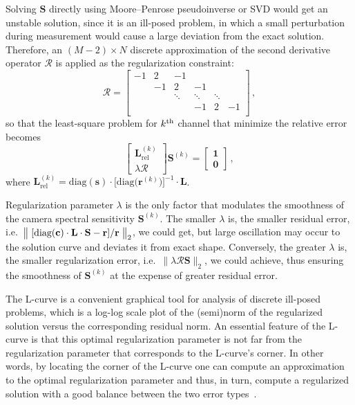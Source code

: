 \documentclass[9pt,twocolumn,twoside]{osajnl}
\begin{document}
Solving $\mathbf{S}$ directly using Moore–Penrose pseudoinverse or SVD would get an unstable solution, since it is an ill-posed problem, in which a small perturbation during measurement would cause a large deviation from the exact solution\cite{Forsgren:02}. Therefore, an $(M-2)\times{}N$ discrete approximation of the second derivative operator $\mathcal{R}$ is applied as the regularization constraint:
\begin{equation}
\mathcal{R} = \begin{bmatrix}
-1	& 2  & -1 	 &  	  &  	   &  	\\
& -1 & 2 	 & -1 	  &  	   &  	\\
&	 & \ddots& \ddots & \ddots &  	\\
&	 & 	 	 & -1 	  & 2 	   & -1 \\
\end{bmatrix}\,,
\label{eq:19}
\end{equation}
so that the least-square problem for $k\textsuperscript{th}$ channel that minimize the relative error becomes
\begin{equation}
\left[
\begin{array}{c}
\mathbf{L}_\text{rel}^{(k)}\\\hline
\lambda\mathcal{R}
\end{array}
\right]%
\mathbf{S}^{(k)} =%
\left[
\begin{array}{c}
\mathbf{1}\\\hline
\mathbf{0}
\end{array}
\right]\,,
\label{eq:20}
\end{equation}
where $\mathbf{L}_\text{rel}^{(k)} = \text{diag}(\mathbf{s})\cdot\Big[\text{diag}\big(\mathbf{r}^{(k)}\big)\Big]^{-1}\cdot\mathbf{L}$.

Regularization parameter $\lambda$ is the only factor that modulates the smoothness of the camera spectral sensitivity $\mathbf{S}^{(k)}$. The smaller $\lambda$ is, the smaller residual error, i.e.\ $\big\|\left.\left[\text{diag}(\mathbf{c})\cdot\mathbf{L}\cdot\mathbf{S} - \mathbf{r}\right]\middle/\mathbf{r}\right.\big\|_2$, we could get, but large oscillation may occur to the solution curve and deviates it from exact shape. Conversely, the greater $\lambda$ is, the smaller regularization error, i.e.\ $\big\|\lambda\mathcal{R}\mathbf{S}\big\|_2$, we could achieve, thus ensuring the smoothness of $\mathbf{S}^{(k)}$ at the expense of greater residual error.

The L-curve is a convenient graphical tool for analysis of discrete ill-posed problems, which is a log-log scale plot of the (semi)norm of the regularized solution versus the corresponding residual norm. An essential feature of the L-curve is that this optimal regularization parameter is not far from the regularization parameter that corresponds to the L-curve’s corner. In other words, by locating the corner of the L-curve one can compute an approximation to the optimal regularization parameter and thus, in turn, compute a regularized solution with a good balance between the two error types~\cite{Hansen:94}.
\end{document}
